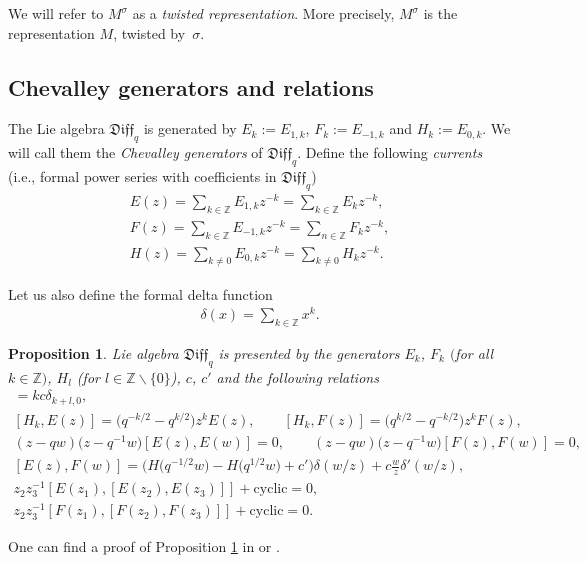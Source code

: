 \documentclass[pdftex]{sigma}
\numberwithin{equation}{section}
\newtheorem{Proposition}[Theorem]{Proposition}
\theoremstyle{definition}
\newcommand{\qD}{\mathfrak{Diff}_q}
\begin{document}
We will refer to $M^{\sigma}$ as a \emph{twisted representation}. More precisely, $M^{\sigma}$ is the representation $M$, twisted by~$\sigma$.

\subsection{Chevalley generators and relations}

The Lie algebra $\qD$ is generated by $E_k := E_{1, k}$, $F_k:=E_{-1, k}$ and $H_k := E_{0, k}$. We will call them the \emph{Chevalley generators} of $\qD$.
Define the following \emph{currents} (i.e., formal power series with coefficients in $\qD$)
\begin{gather*}
E(z) = \sum_{k \in \mathbb{Z}} E_{1,k} z^{-k} = \sum_{k \in \mathbb{Z}} E_k z^{-k},\\
F(z) = \sum_{k \in \mathbb{Z}} E_{-1, k} z^{-k} = \sum_{n \in \mathbb{Z}} F_k z^{-k},\\
H(z) = \sum_{k \neq 0} E_{0, k} z^{-k} = \sum_{k \neq 0} H_k z^{-k}.
\end{gather*}

Let us also define the formal delta function
\begin{gather*}
\delta(x) = \sum_{k \in \mathbb{Z}} x^k.
\end{gather*}
\begin{Proposition}\label{relation} Lie algebra $\qD$ is presented by the generators $E_k$, $F_k$ $($for all $k \in \mathbb{Z})$, $H_l$ {\upshape(}for $l \in \mathbb{Z} \backslash \{0 \}${\upshape)}, $c$, $c'$ and the following relations
\begin{gather}
[H_k, H_l] = k c \delta_{k+l, 0}, \label{RqDHH} \\
[H_k , E(z)] = \big(q^{-k/2}-q^{k/2}\big)z^k E(z), \qquad
[H_k, F(z)]= \big(q^{k/2}-q^{-k/2}\big) z^k F(z), \label{RqDHE-F} \\
(z-qw)\big(z-q^{-1} w\big) [E(z), E(w)]= 0, \qquad
(z-qw)\big(z-q^{-1} w\big) [F(z), F(w)]= 0 , \label{RqDE2} \\
[ E (z) , F (w)] = \big( H\big( q^{-1/2} w \big) - H\big(q^{1/2} w\big) + c'\big) \delta( w / z ) + c \frac{w}{z} \delta'(w/ z),\label{RqDEF} \\
z_2 z_3^{-1} [E(z_1), [E(z_2), E(z_3)]] + \mathrm{cyclic} =0, \label{RqDEEE} \\
z_2 z_3^{-1} [F(z_1), [F(z_2), F(z_3)]] + \mathrm{cyclic} =0. \label{RqDFFF}
\end{gather}
\end{Proposition}
One can find a proof of Proposition \ref{relation} in \cite[Theorem~2.1]{M07} or \cite[Theorem~5.5]{Ts}.
\end{document}
